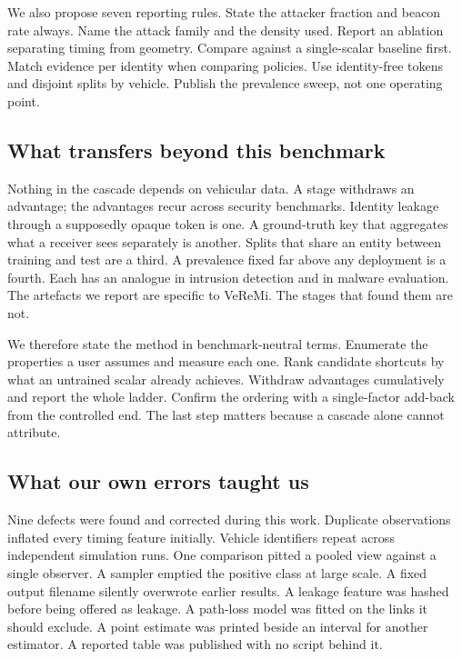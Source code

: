 \documentclass[conference]{IEEEtran}
\begin{document}
We also propose seven reporting rules.
State the attacker fraction and beacon rate always.
Name the attack family and the density used.
Report an ablation separating timing from geometry.
Compare against a single-scalar baseline first.
Match evidence per identity when comparing policies.
Use identity-free tokens and disjoint splits by vehicle.
Publish the prevalence sweep, not one operating point.

\subsection{What transfers beyond this benchmark}

Nothing in the cascade depends on vehicular data.
A stage withdraws an advantage; the advantages recur across security benchmarks.
Identity leakage through a supposedly opaque token is one.
A ground-truth key that aggregates what a receiver sees separately is another.
Splits that share an entity between training and test are a third.
A prevalence fixed far above any deployment is a fourth.
Each has an analogue in intrusion detection and in malware evaluation.
The artefacts we report are specific to VeReMi.
The stages that found them are not.

We therefore state the method in benchmark-neutral terms.
Enumerate the properties a user assumes and measure each one.
Rank candidate shortcuts by what an untrained scalar already achieves.
Withdraw advantages cumulatively and report the whole ladder.
Confirm the ordering with a single-factor add-back from the controlled end.
The last step matters because a cascade alone cannot attribute.

\subsection{What our own errors taught us}

Nine defects were found and corrected during this work.
Duplicate observations inflated every timing feature initially.
Vehicle identifiers repeat across independent simulation runs.
One comparison pitted a pooled view against a single observer.
A sampler emptied the positive class at large scale.
A fixed output filename silently overwrote earlier results.
A leakage feature was hashed before being offered as leakage.
A path-loss model was fitted on the links it should exclude.
A point estimate was printed beside an interval for another estimator.
A reported table was published with no script behind it.
\end{document}
